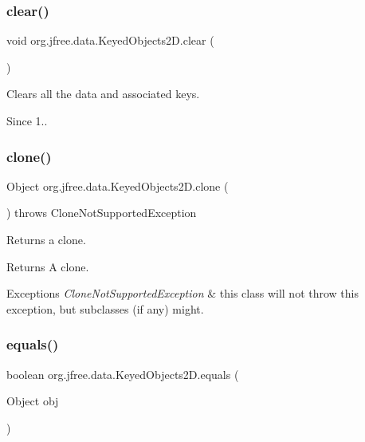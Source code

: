 \subsubsection{\texorpdfstring{clear()}{clear()}}
{\footnotesize\ttfamily void org.\+jfree.\+data.\+Keyed\+Objects2\+D.\+clear (\begin{DoxyParamCaption}{ }\end{DoxyParamCaption})}

Clears all the data and associated keys.

\begin{DoxySince}{Since}
1.. 
\end{DoxySince}
\mbox{\label{classorg_1_1jfree_1_1data_1_1_keyed_objects2_d_ae84acbd0aefbcbd363abb34ee9b8eb44}} 
\subsubsection{\texorpdfstring{clone()}{clone()}}
{\footnotesize\ttfamily Object org.\+jfree.\+data.\+Keyed\+Objects2\+D.\+clone (\begin{DoxyParamCaption}{ }\end{DoxyParamCaption}) throws Clone\+Not\+Supported\+Exception}

Returns a clone.

\begin{DoxyReturn}{Returns}
A clone.
\end{DoxyReturn}

\begin{DoxyExceptions}{Exceptions}
{\em Clone\+Not\+Supported\+Exception} & this class will not throw this exception, but subclasses (if any) might. \\
\hline
\end{DoxyExceptions}
\mbox{\label{classorg_1_1jfree_1_1data_1_1_keyed_objects2_d_a495ae6c3b2edbeee6c35249d2437b707}} 
\subsubsection{\texorpdfstring{equals()}{equals()}}
{\footnotesize\ttfamily boolean org.\+jfree.\+data.\+Keyed\+Objects2\+D.\+equals (\begin{DoxyParamCaption}\item[{Object}]{obj }\end{DoxyParamCaption})}

